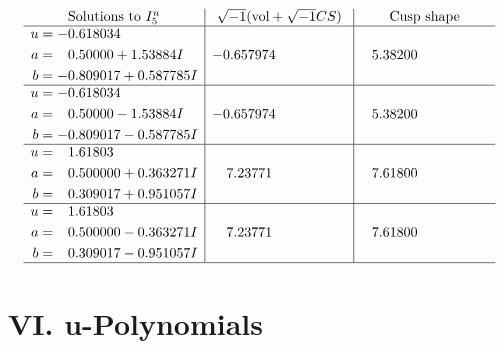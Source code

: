 \documentclass[1p]{elsarticle_modified}
\theoremstyle{definition}
\newcommand{\I}{\sqrt{-1}}
\begin{document}
$$\begin{array}{c|c|c}  
\text{Solutions to }I^u_{5}& \I (\text{vol} + \sqrt{-1}CS) & \text{Cusp shape}\\
 \hline 
\begin{aligned}
u &= -0.618034\phantom{ +0.000000I} \\
a &= \phantom{-}0.50000 + 1.53884 I \\
b &= -0.809017 + 0.587785 I\end{aligned}
 & -0.657974\phantom{ +0.000000I} & \phantom{-}5.38200\phantom{ +0.000000I} \\ \hline\begin{aligned}
u &= -0.618034\phantom{ +0.000000I} \\
a &= \phantom{-}0.50000 - 1.53884 I \\
b &= -0.809017 - 0.587785 I\end{aligned}
 & -0.657974\phantom{ +0.000000I} & \phantom{-}5.38200\phantom{ +0.000000I} \\ \hline\begin{aligned}
u &= \phantom{-}1.61803\phantom{ +0.000000I} \\
a &= \phantom{-}0.500000 + 0.363271 I \\
b &= \phantom{-}0.309017 + 0.951057 I\end{aligned}
 & \phantom{-}7.23771\phantom{ +0.000000I} & \phantom{-}7.61800\phantom{ +0.000000I} \\ \hline\begin{aligned}
u &= \phantom{-}1.61803\phantom{ +0.000000I} \\
a &= \phantom{-}0.500000 - 0.363271 I \\
b &= \phantom{-}0.309017 - 0.951057 I\end{aligned}
 & \phantom{-}7.23771\phantom{ +0.000000I} & \phantom{-}7.61800\phantom{ +0.000000I}\\
 \hline 
 \end{array}$$\newpage
\newpage\renewcommand{\arraystretch}{1}
\centering \section*{ VI. u-Polynomials}
\end{document}
